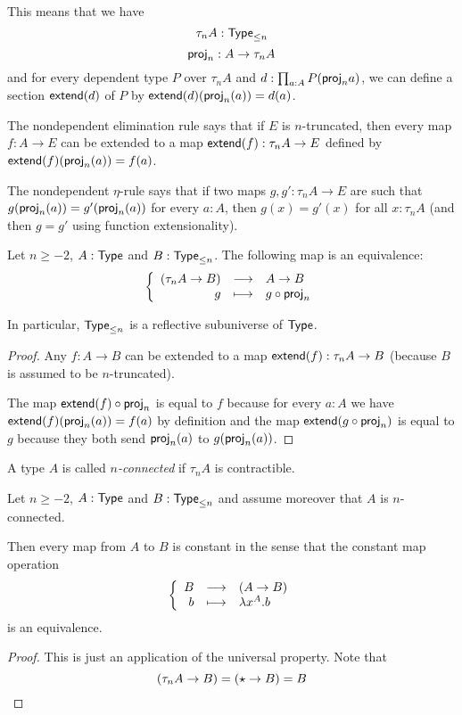 This means that we have
\[\tau_nA:\mathsf{Type}_{\le n}\]
\[\mathsf{proj}_n:A\to\tau_nA\]
and for every dependent type $P$ over $\tau_nA$ and $d:\prod_{a:A}P(\mathsf{proj}_na)$,
we can define a section $\mathsf{extend}(d)$ of $P$ by $\mathsf{extend}(d)(\mathsf{proj}_n(a))=d(a)$.

The nondependent elimination rule says that if $E$ is $n$-truncated, then every
map $f:A\to{}E$ can be extended to a map $\mathsf{extend}(f):\tau_nA\to{}E$ defined by
$\mathsf{extend}(f)(\mathsf{proj}_n(a))=f(a)$.

The nondependent $\eta$-rule says that if two maps $g,g':\tau_nA\to{}E$ are
such that $g(\mathsf{proj}_n(a))=g'(\mathsf{proj}_n(a))$ for every $a:A$, then $g(x)=g'(x)$
for all $x:\tau_nA$ (and then $g=g'$ using function extensionality).

\begin{lem}

  Let $n\ge-2$, $A:\mathsf{Type}$ and $B:\mathsf{Type}_{\le n}$. The following map is an
  equivalence:
  \[\left\{\begin{array}{rcl}(\tau_nA\to{}B) & \longrightarrow & A\to{}B \\ g & \longmapsto & g\circ\mathsf{proj}_n \end{array}\right.\]

  In particular, $\mathsf{Type}_{\le n}$ is a reflective subuniverse of $\mathsf{Type}$.
\end{lem}

\begin{proof}
  Any $f:A\to{}B$ can be extended to a map $\mathsf{extend}(f):\tau_nA\to{}B$ (because
  $B$ is assumed to be $n$-truncated).

  The map $\mathsf{extend}(f)\circ\mathsf{proj}_n$ is equal to $f$ because for every $a:A$ we
  have $\mathsf{extend}(f)(\mathsf{proj}_n(a))=f(a)$ by definition and the map
  $\mathsf{extend}(g\circ\mathsf{proj}_n)$ is equal to $g$ because they both send $\mathsf{proj}_n(a)$
  to $g(\mathsf{proj}_n(a))$.
\end{proof}

\begin{defn}
  A type $A$ is called \emph{$n$-connected} if $\tau_nA$ is contractible.
\end{defn}

\begin{lem}
  \label{connectedtotruncated}
  Let $n\ge-2$, $A:\mathsf{Type}$ and $B:\mathsf{Type}_{\le n}$ and assume moreover that $A$ is
  $n$-connected.

  Then every map from $A$ to $B$ is constant in the sense that the constant map
  operation
  \[\left\{\begin{array}{rcl}B & \longrightarrow & (A\to{}B) \\ b & \longmapsto & \lambda{}x^A.b \end{array}\right.\]
  is an equivalence.
\end{lem}
\begin{proof}
  This is just an application of the universal property. Note that
  \[(\tau_nA\to{}B)=(\star\to{}B)=B\]
\end{proof}

